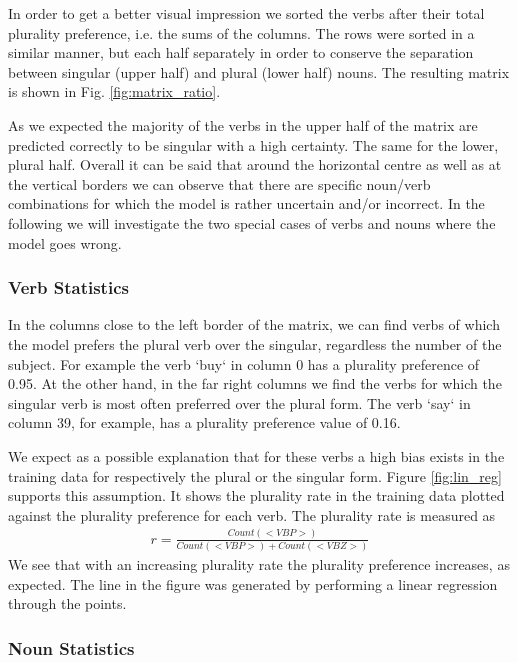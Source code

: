 In order to get a better visual impression we sorted the verbs 
after their total plurality preference, i.e. the sums of the columns. 
The rows were sorted in a similar manner, but each half separately in order to conserve the separation between singular (upper half) and plural (lower half) nouns. The resulting matrix is shown in Fig. \ref{fig:matrix_ratio}.

As we expected the majority of the verbs in the upper half of the matrix are predicted correctly to be singular with a high certainty. The same for the lower, plural half. Overall it can be said that around the horizontal centre 
as well as at the vertical borders we can observe that there are specific 
noun/verb combinations for which the model is rather uncertain and/or incorrect. 
In the following we will investigate the two special cases of verbs and nouns where the model goes wrong.

\subsubsection{Verb Statistics}

In the columns close to the left border of the matrix, we can find verbs of which the model prefers the plural verb over the singular, regardless the number of the subject. For example the verb `buy` in column 0 has a plurality preference of 0.95. At the other hand, in the far right columns we find the verbs for which the singular verb is most often preferred over the plural form. The verb `say` in column 39, for example, has a plurality preference value of 0.16.

We expect as a possible explanation that for these verbs a high bias exists
in the training data for respectively the plural or the singular form.
Figure \ref{fig:lin_reg} supports this assumption. It shows the plurality rate in the training data plotted against the plurality preference for each verb. 
The plurality rate is measured as
\begin{align*}
	r = \frac{Count(<VBP>)}{Count(<VBP>) + Count(<VBZ>)} 
\end{align*}
We see that with an increasing plurality rate the plurality preference increases, as expected. The line in the figure was generated by performing a linear regression through the points. 

\subsubsection{Noun Statistics}

